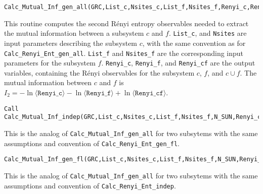 \begin{lstlisting}[style=fortran]
Calc_Mutual_Inf_gen_all(GRC,List_c,Nsites_c,List_f,Nsites_f,Renyi_c,Renyi_f,Renyi_cf)
\end{lstlisting}
This routine computes the second R\'enyi entropy observables needed to extract the mutual information between a subsystem $c$ and $f$. \texttt{List\_c}, and \texttt{Nsites} are input parameters describing the subsystem $c$, with the same convention as for \texttt{Calc\_Renyi\_Ent\_gen\_all}. \texttt{List\_f} and \texttt{Nsites\_f} are the corresponding input parameters for the subsystem $f$. \texttt{Renyi\_c}, \texttt{Renyi\_f}, and \texttt{Renyi\_cf} are the output variables, containing the R\'enyi observables for the subsystem $c$, $f$, and $c\cup f$. The mutual information between $c$ and $f$ is $I_2=-\ln \langle \texttt{Renyi\_c}\rangle -\ln \langle \texttt{Renyi\_f}\rangle +\ln \langle \texttt{Renyi\_cf}\rangle$.

\begin{lstlisting}[style=fortran,breaklines=true]
Call Calc_Mutual_Inf_indep(GRC,List_c,Nsites_c,List_f,Nsites_f,N_SUN,Renyi_c,Renyi_f,Renyi_cf)
\end{lstlisting}
This is the analog of \texttt{Calc\_Mutual\_Inf\_gen\_all} for two subsytems with the same assumptions and convention of \texttt{Calc\_Renyi\_Ent\_gen\_fl}.

\begin{lstlisting}[style=fortran,breaklines=true]
Calc_Mutual_Inf_gen_fl(GRC,List_c,Nsites_c,List_f,Nsites_f,N_SUN,Renyi_c,Renyi_f,Renyi_cf)
\end{lstlisting}
This is the analog of \texttt{Calc\_Mutual\_Inf\_gen\_all} for two subsytems with the same assumptions and convention of \texttt{Calc\_Renyi\_Ent\_indep}.
